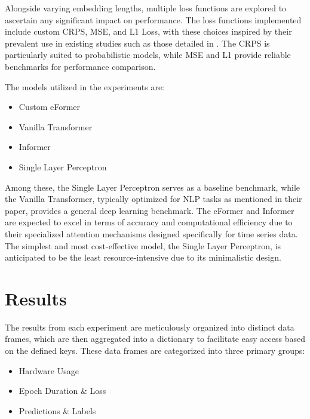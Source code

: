 \documentclass{article}
\begin{document}
Alongside varying embedding lengths, multiple loss functions are explored to ascertain any significant impact on performance. The loss functions implemented include custom CRPS, MSE, and L1 Loss, with these choices inspired by their prevalent use in existing studies such as those detailed in \cite{Informer, autoformer, cross-entropy_time-series}. The CRPS is particularly suited to probabilistic models, while MSE and L1 provide reliable benchmarks for performance comparison.

The models utilized in the experiments are:
\begin{multicols}{2}
\begin{itemize}
    \item Custom eFormer
    \item Vanilla Transformer
    \item Informer
    \item Single Layer Perceptron
\end{itemize}
\end{multicols}

Among these, the Single Layer Perceptron serves as a baseline benchmark, while the Vanilla Transformer, typically optimized for NLP tasks as \cite{vanilla-transformer} mentioned in their paper, provides a general deep learning benchmark. The eFormer and Informer are expected to excel in terms of accuracy and computational efficiency due to their specialized attention mechanisms designed specifically for time series data. The simplest and most cost-effective model, the Single Layer Perceptron, is anticipated to be the least resource-intensive due to its minimalistic design.


\section{Results}

The results from each experiment are meticulously organized into distinct data frames, which are then aggregated into a dictionary to facilitate easy access based on the defined keys. These data frames are categorized into three primary groups:
\begin{multicols}{2}
\begin{itemize}
    \item Hardware Usage
    \item Epoch Duration \& Loss
    \item Predictions \& Labels
\end{itemize}
\end{multicols}
\end{document}
